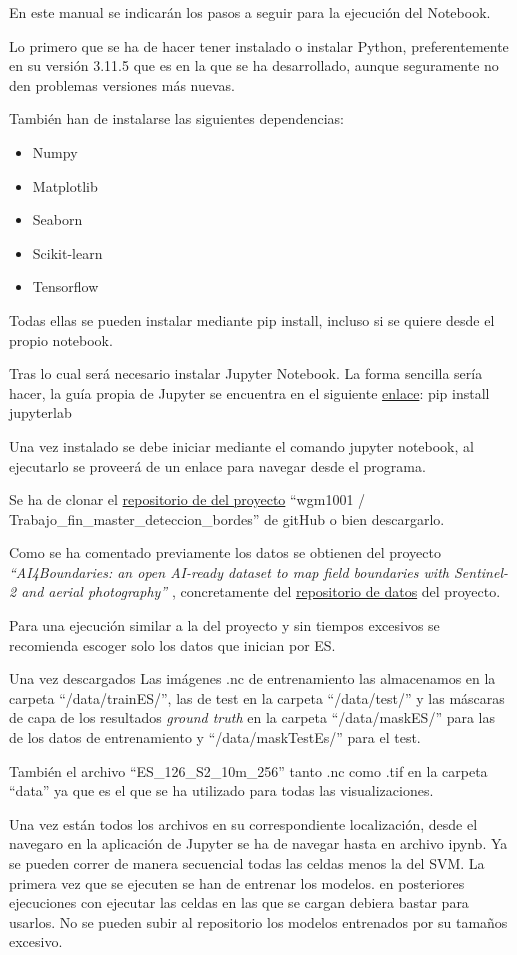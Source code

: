 En este manual se indicarán los pasos a seguir para la ejecución del Notebook.

Lo primero que se ha de hacer tener instalado o instalar Python, preferentemente en su versión 3.11.5 que es en la que se ha desarrollado, aunque seguramente no den problemas versiones más nuevas.

También han de instalarse las siguientes dependencias:
\begin{itemize}
	\item Numpy
	\item Matplotlib
	\item Seaborn
	\item Scikit-learn
	\item Tensorflow
\end{itemize}
Todas ellas se pueden instalar mediante pip install, incluso si se quiere desde el propio notebook.

Tras lo cual será necesario instalar Jupyter Notebook. La forma sencilla sería hacer, la guía propia de Jupyter se encuentra en el siguiente \href{https://jupyter.org/install}{enlace}:
pip install jupyterlab

Una vez instalado se debe iniciar mediante el comando jupyter notebook, al ejecutarlo se proveerá de un enlace para navegar desde el programa. 

Se ha de clonar el \href{https://github.com/wgm1001/Trabajo_fin_master_deteccion_bordes}{repositorio de del proyecto} ``wgm1001 / Trabajo\_fin\_master\_deteccion\_bordes'' de gitHub o bien descargarlo.

Como se ha comentado previamente los datos se obtienen del proyecto \textit{``AI4Boundaries: an open AI-ready dataset to map field boundaries with Sentinel-2 and aerial photography''} \cite{AI4boundaries}, concretamente del  \href{https://jeodpp.jrc.ec.europa.eu/ftp/jrc-opendata/DRLL/AI4BOUNDARIES/sentinel2/}{repositorio de datos} del proyecto.

Para una ejecución similar a la del proyecto y sin tiempos excesivos se recomienda escoger solo los datos que inician por ES.

Una vez descargados Las imágenes .nc de entrenamiento las almacenamos en la carpeta ``/data/trainES/'', las de test en la carpeta ``/data/test/'' y las máscaras de capa de los resultados \textit{ground truth} en la carpeta ``/data/maskES/'' para las de los datos de entrenamiento y ``/data/maskTestEs/'' para el test.

También el archivo ``ES\_126\_S2\_10m\_256'' tanto .nc como .tif en la carpeta ``data'' ya que es el que se ha utilizado para todas las visualizaciones.

Una vez están todos los archivos en su correspondiente localización, desde el navegaro en la aplicación de Jupyter se ha de navegar hasta en archivo ipynb. Ya se pueden correr de manera secuencial todas las celdas menos la del SVM. La primera vez que se ejecuten se han de entrenar los modelos. en posteriores ejecuciones con ejecutar las celdas en las que se cargan debiera bastar para usarlos. No se pueden subir al repositorio los modelos entrenados  por su tamaños excesivo.